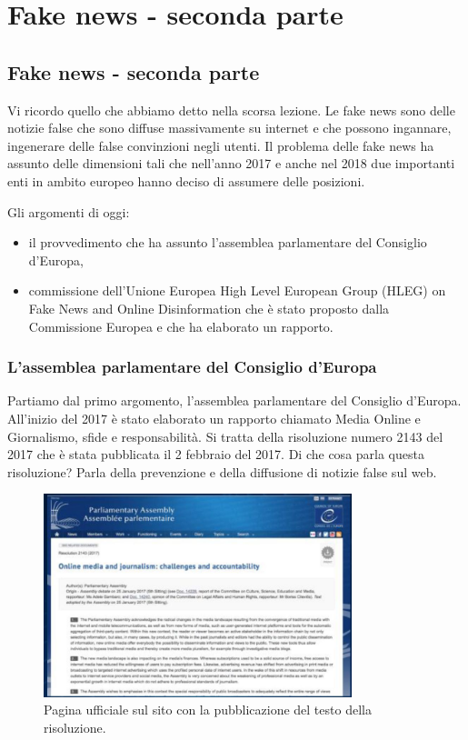 \chapter{Fake news - seconda parte}

\section{Fake news - seconda parte}

Vi ricordo quello che abbiamo detto nella scorsa lezione. Le fake news sono delle notizie false che sono diffuse massivamente su internet e che possono ingannare, ingenerare delle false convinzioni negli utenti. Il problema delle fake news ha assunto delle dimensioni tali che nell'anno 2017 e anche nel 2018 due importanti enti in ambito europeo hanno deciso di assumere delle posizioni. 

Gli argomenti di oggi:

\begin{itemize}
    \item il provvedimento che ha assunto l'assemblea parlamentare del Consiglio d'Europa, 
    \item commissione dell'Unione Europea High Level European Group (HLEG) on Fake News and Online Disinformation che è stato proposto dalla Commissione Europea e che ha elaborato un rapporto.
\end{itemize}

\subsection{L'assemblea parlamentare del Consiglio d'Europa}
Partiamo dal primo argomento, l'assemblea parlamentare del Consiglio d'Europa.
All'inizio del 2017 è stato elaborato un rapporto chiamato Media Online e Giornalismo, sfide e responsabilità. Si tratta della risoluzione numero 2143 del 2017 che è stata pubblicata il 2 febbraio del 2017. 
Di che cosa parla questa risoluzione? 
Parla della prevenzione e della diffusione di notizie false sul web. 

\begin{figure}[ht]
\centering
\includegraphics[width=0.8\textwidth]{images/11_lez_fig_01.jpg}
\caption{Pagina ufficiale sul sito con la pubblicazione del testo della risoluzione.}
\label{fig:11_lez_fig_01}
\end{figure}


